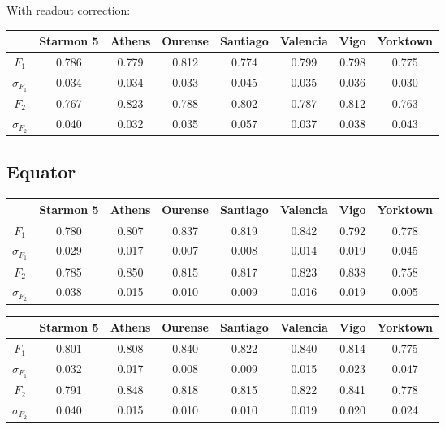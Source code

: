 With readout correction:
\begin{table}[H]
    \centering
    \begin{tabular}{|c|c|c|c|c|c|c|c|}
    \hline
    \textbf{} & \textbf{Starmon 5} & \textbf{Athens} & \textbf{Ourense} & \textbf{Santiago} & \textbf{Valencia} & \textbf{Vigo} & \textbf{Yorktown} \\ \hline
    $F_1$              & 0.786 & 0.779 & 0.812 & 0.774 & 0.799 & 0.798 & 0.775 \\ \hline
    $\sigma_{F_1}$     & 0.034 & 0.034 & 0.033 & 0.045 & 0.035 & 0.036 & 0.030 \\ \hline
    $F_2$              & 0.767 & 0.823 & 0.788 & 0.802 & 0.787 & 0.812 & 0.763 \\ \hline
    $\sigma_{F_2}$     & 0.040 & 0.032 & 0.035 & 0.057 & 0.037 & 0.038 & 0.043 \\ \hline
    \end{tabular}
\end{table}
\subsection{Equator}

\begin{table}[H]
    \centering
    \begin{tabular}{|c|c|c|c|c|c|c|c|}
    \hline
    \textbf{} & \textbf{Starmon 5} & \textbf{Athens} & \textbf{Ourense} & \textbf{Santiago} & \textbf{Valencia} & \textbf{Vigo} & \textbf{Yorktown} \\ \hline
    $F_1$              & 0.780 & 0.807 & 0.837 & 0.819 & 0.842 & 0.792 & 0.778 \\ \hline
    $\sigma_{F_1}$     & 0.029 & 0.017 & 0.007 & 0.008 & 0.014 & 0.019 & 0.045 \\ \hline
    $F_2$              & 0.785 & 0.850 & 0.815 & 0.817 & 0.823 & 0.838 & 0.758 \\ \hline
    $\sigma_{F_2}$     & 0.038 & 0.015 & 0.010 & 0.009 & 0.016 & 0.019 & 0.005 \\ \hline
    \end{tabular}
\end{table}


\begin{table}[H]
    \centering
    \begin{tabular}{|c|c|c|c|c|c|c|c|}
    \hline
    \textbf{} & \textbf{Starmon 5} & \textbf{Athens} & \textbf{Ourense} & \textbf{Santiago} & \textbf{Valencia} & \textbf{Vigo} & \textbf{Yorktown} \\ \hline
    $F_1$              & 0.801 & 0.808 & 0.840 & 0.822 & 0.840 & 0.814 & 0.775 \\ \hline
    $\sigma_{F_1}$     & 0.032 & 0.017 & 0.008 & 0.009 & 0.015 & 0.023 & 0.047 \\ \hline
    $F_2$              & 0.791 & 0.848 & 0.818 & 0.815 & 0.822 & 0.841 & 0.778 \\ \hline
    $\sigma_{F_2}$     & 0.040 & 0.015 & 0.010 & 0.010 & 0.019 & 0.020 & 0.024 \\ \hline
    \end{tabular}
\end{table}
